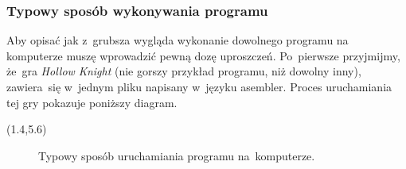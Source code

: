 \documentclass[10pt,t]{beamer}
\begin{document}
\begin{frame}
  \frametitle{Typowy sposób wykonywania programu}


  Aby opisać jak z~grubsza wygląda wykonanie dowolnego programu na
  komputerze muszę wprowadzić pewną dozę uproszczeń. Po~pierwsze
  przyjmijmy, że~gra \textit{Hollow Knight} (nie gorszy przykład programu,
  niż dowolny inny), zawiera~się w~jednym pliku napisany w~języku asembler.
  Proces uruchamiania tej gry pokazuje poniższy diagram.





  \begin{textblock}{10.1}(1.4,5.6)

    \begin{figure}

      \label{fig:Running-Hollow-Knight}


      \caption{Typowy sposób uruchamiania programu na~komputerze.}


    \end{figure}

  \end{textblock}

\end{frame}
\end{document}
